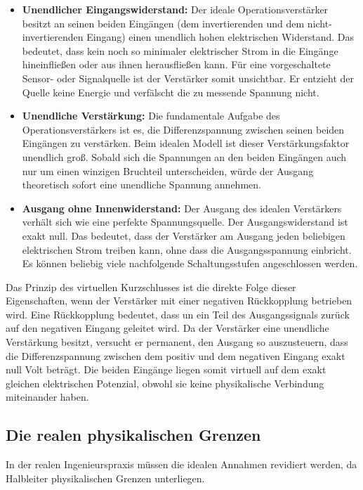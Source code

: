 \documentclass[11pt,a4paper]{article}
\begin{document}
\begin{itemize}
    \item \textbf{Unendlicher Eingangswiderstand:} Der ideale Operationsverstärker besitzt an seinen beiden Eingängen (dem invertierenden und dem nicht-invertierenden Eingang) einen unendlich hohen elektrischen Widerstand. Das bedeutet, dass kein noch so minimaler elektrischer Strom in die Eingänge hineinfließen oder aus ihnen herausfließen kann. Für eine vorgeschaltete Sensor- oder Signalquelle ist der Verstärker somit unsichtbar. Er entzieht der Quelle keine Energie und verfälscht die zu messende Spannung nicht.
    \item \textbf{Unendliche Verstärkung:} Die fundamentale Aufgabe des Operationsverstärkers ist es, die Differenzspannung zwischen seinen beiden Eingängen zu verstärken. Beim idealen Modell ist dieser Verstärkungsfaktor unendlich groß. Sobald sich die Spannungen an den beiden Eingängen auch nur um einen winzigen Bruchteil unterscheiden, würde der Ausgang theoretisch sofort eine unendliche Spannung annehmen.
    \item \textbf{Ausgang ohne Innenwiderstand:} Der Ausgang des idealen Verstärkers verhält sich wie eine perfekte Spannungsquelle. Der Ausgangswiderstand ist exakt null. Das bedeutet, dass der Verstärker am Ausgang jeden beliebigen elektrischen Strom treiben kann, ohne dass die Ausgangsspannung einbricht. Es können beliebig viele nachfolgende Schaltungsstufen angeschlossen werden.
\end{itemize}

Das Prinzip des virtuellen Kurzschlusses ist die direkte Folge dieser Eigenschaften, wenn der Verstärker mit einer negativen Rückkopplung betrieben wird. Eine Rückkopplung bedeutet, dass un ein Teil des Ausgangssignals zurück auf den negativen Eingang geleitet wird. Da der Verstärker eine unendliche Verstärkung besitzt, versucht er permanent, den Ausgang so auszusteuern, dass die Differenzspannung zwischen dem positiv und dem negativen Eingang exakt null Volt beträgt. Die beiden Eingänge liegen somit virtuell auf dem exakt gleichen elektrischen Potenzial, obwohl sie keine physikalische Verbindung miteinander haben.

\subsection{Die realen physikalischen Grenzen}

In der realen Ingenieurspraxis müssen die idealen Annahmen revidiert werden, da Halbleiter physikalischen Grenzen unterliegen.
\end{document}

